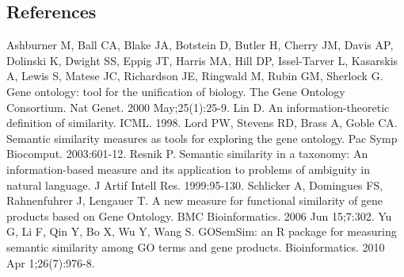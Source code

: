 \documentclass{article}
\begin{document}
\subsection{References}
Ashburner M, Ball CA, Blake JA, Botstein D, Butler H, Cherry JM, Davis AP, Dolinski K, Dwight SS, Eppig JT, Harris MA, Hill DP, Issel-Tarver L, Kasarskis A, Lewis S, Matese JC, Richardson JE, Ringwald M, Rubin GM, Sherlock G. Gene ontology: tool for the unification of biology. The Gene Ontology Consortium. Nat Genet. 2000 May;25(1):25-9.
\newline
Lin D. An information-theoretic definition of similarity. ICML. 1998.
\newline
Lord PW, Stevens RD, Brass A, Goble CA. Semantic similarity measures as tools for exploring the gene ontology. Pac Symp Biocomput. 2003:601-12.
\newline
Resnik P. Semantic similarity in a taxonomy: An information-based measure and its application to problems of ambiguity in natural language. J Artif Intell Res. 1999:95-130.
\newline
Schlicker A, Domingues FS, Rahnenfuhrer J, Lengauer T. A new measure for functional similarity of gene products based on Gene Ontology. BMC Bioinformatics. 2006 Jun 15;7:302.
\newline
Yu G, Li F, Qin Y, Bo X, Wu Y, Wang S. GOSemSim: an R package for measuring semantic similarity among GO terms and gene products. Bioinformatics. 2010 Apr 1;26(7):976-8.
\end{document}
